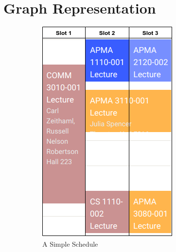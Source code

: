 \documentclass[12pt]{article}
\begin{document}
\section{Graph Representation}
\begin{figure}[H]
    \centering
    \begin{subfigure}{.4\textwidth}
        \centering
        \includegraphics[width=.9\columnwidth]{example1}
        \caption{A Simple Schedule}
        \label{fig:exp1}
    \end{subfigure}%
    \begin{subfigure}{.6\textwidth}
        \centering
        \begin{tikzpicture}[auto, node distance=3.5cm, every loop/.style={},
            thick,main node/.style={circle,draw,font=\sffamily\bfseries\small}]
        

\end{tikzpicture}
\end{subfigure}
\end{figure}
\end{document}
